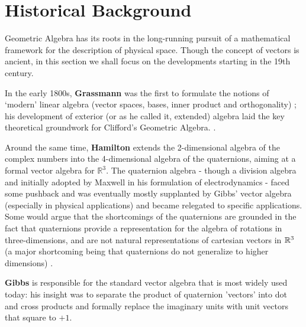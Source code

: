 \section{Historical Background}
Geometric Algebra has its roots in the long-running pursuit of a mathematical framework for the description of physical space. Though the concept of vectors is ancient, in this section we shall focus on the developments starting in the 19th century.

In the early 1800s, \textbf{Grassmann} was the first to formulate the notions of `modern' linear algebra (vector spaces, bases, inner product and orthogonality) \cite{grassmann}; his development of exterior (or as he called it, extended) algebra laid the key theoretical groundwork for Clifford's Geometric Algebra. \cite[p.28-29]{ga-foundations}.

Around the same time, \textbf{Hamilton} extends the 2-dimensional algebra of the complex numbers into the 4-dimensional algebra of the quaternions, aiming at a formal vector algebra for $\mathbb{R}^3$.
The quaternion algebra - though a division algebra and initially adopted by Maxwell in his formulation of electrodynamics - faced some pushback and was eventually mostly supplanted by Gibbs' vector algebra (especially in physical applications) and became relegated to specific applications. Some would argue that the shortcomings of the quaternions are grounded in the fact that quaternions provide a representation for the algebra of rotations in three-dimensions, and are not natural representations of cartesian vectors in $\mathbb{R}^3$ (a major shortcoming being that quaternions do not generalize to higher dimensions) \cite{ga-history}.

\textbf{Gibbs} is responsible for the standard vector algebra that is most widely used today: his insight was to separate the product of quaternion 'vectors' into dot and cross products and formally replace the imaginary units with unit vectors that square to $+1$.

